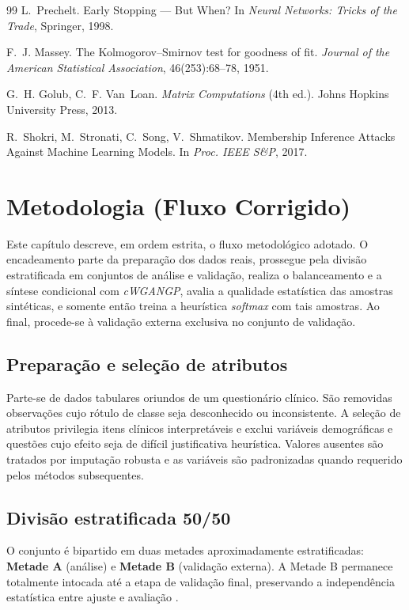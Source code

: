 \documentclass[12pt,a4paper]{report}
\begin{document}
\begin{thebibliography}{99}
L.~Prechelt. \newblock Early Stopping --- But When? \newblock In \emph{Neural Networks: Tricks of the Trade}, Springer, 1998.

F.~J. Massey. \newblock The Kolmogorov–Smirnov test for goodness of fit. \newblock \emph{Journal of the American Statistical Association}, 46(253):68--78, 1951.

G.~H. Golub, C.~F. Van~Loan. \newblock \emph{Matrix Computations} (4th ed.). \newblock Johns Hopkins University Press, 2013.

R.~Shokri, M.~Stronati, C.~Song, V.~Shmatikov. \newblock Membership Inference Attacks Against Machine Learning Models. \newblock In \emph{Proc. IEEE S\&P}, 2017.

\end{thebibliography}

\chapter{Metodologia (Fluxo Corrigido)}
\label{chap:metodologia}

Este capítulo descreve, em ordem estrita, o fluxo metodológico adotado. O encadeamento parte da preparação dos dados reais, prossegue pela divisão estratificada em conjuntos de análise e validação, realiza o balanceamento e a síntese condicional com \emph{cWGAN\textendash GP}, avalia a qualidade estatística das amostras sintéticas, e somente então treina a heurística \emph{softmax} com tais amostras. Ao final, procede-se à validação externa exclusiva no conjunto de validação.

\section{Preparação e seleção de atributos}
Parte-se de dados tabulares oriundos de um questionário clínico. São removidas observações cujo rótulo de classe seja desconhecido ou inconsistente. A seleção de atributos privilegia itens clínicos interpretáveis e exclui variáveis demográficas e questões cujo efeito seja de difícil justificativa heurística. Valores ausentes são tratados por imputação robusta e as variáveis são padronizadas quando requerido pelos métodos subsequentes.

\section{Divisão estratificada 50/50}
O conjunto é bipartido em duas metades aproximadamente estratificadas: \textbf{Metade A} (análise) e \textbf{Metade B} (validação externa). A Metade B permanece totalmente intocada até a etapa de validação final, preservando a independência estatística entre ajuste e avaliação \cite{Prechelt1998EarlyStopping}.
\end{document}
